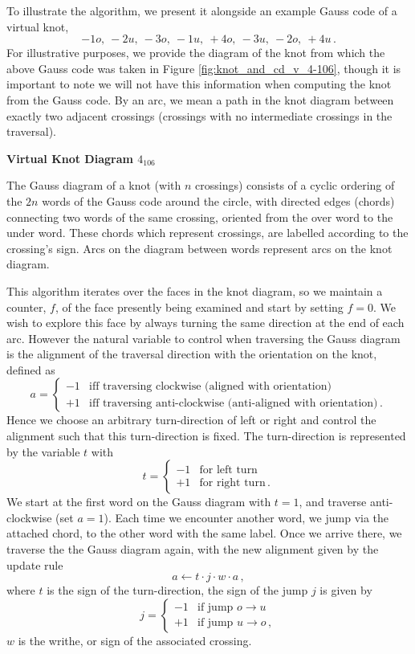\documentclass[12pt]{report}
\newcommand{\notered}[1]{{\color{Red} \textbf{#1}}}
\begin{document}
	To illustrate the algorithm, we present it alongside an example Gauss code of a virtual knot,
	\[-1o,\ -2u,\ -3o,\ -1u,\ +4o,\ -3u,\ -2o,\ +4u\,.\]
	For illustrative purposes, we provide the diagram of the knot from which the above Gauss code was taken in Figure \ref{fig:knot_and_cd_v_4-106}, though it is important to note we will not have this information when computing the knot from the Gauss code. By an arc, we mean a path in the knot diagram between exactly two adjacent crossings (crossings with no intermediate crossings in the traversal).
	
	\notered{Virtual Knot Diagram $4_{106}$}
		
	The Gauss diagram of a knot (with $n$ crossings) consists of a cyclic ordering of the $2n$ words of the Gauss code around the circle, with directed edges (chords) connecting two words of the same crossing, oriented from the over word to the under word. These chords which represent crossings, are labelled according to the crossing's sign. Arcs on the diagram between words represent arcs on the knot diagram.
	
	This algorithm iterates over the faces in the knot diagram, so we maintain a counter, $f$, of the face presently being examined and start by setting $f = 0$. We wish to explore this face by always turning the same direction at the end of each arc. However the natural variable to control when traversing the Gauss diagram is the alignment of the traversal direction with the orientation on the knot, defined as
	\[a = \begin{cases}
		-1 & \text{iff traversing clockwise (aligned with orientation)} \\
		+1 & \text{iff traversing anti-clockwise (anti-aligned with orientation)}\,.
	\end{cases}\] Hence we choose an arbitrary  turn-direction of left or right and control the alignment such that this turn-direction is fixed. The turn-direction is represented by the variable $t$ with
	\[t = \begin{cases}
		-1	& \text{for left turn}\\
		+1	& \text{for right turn} \,.
	\end{cases}\]
	We start at the first word on the Gauss diagram with $t = 1$, and traverse anti-clockwise (set $a = 1$). Each time we encounter another word, we jump via the attached chord, to the other word with the same label. Once we arrive there, we traverse the the Gauss diagram again, with the new alignment given by the update rule
	\[a \leftarrow t \cdot j \cdot w \cdot a\,,\]
	where $t$ is the sign of the turn-direction, the sign of the jump $j$ is given by
	\[j = \begin{cases}
		-1	& \text{if jump $o \to u$}\\
		+1	& \text{if jump $u \to o$}\,,
	\end{cases}\]
	$w$ is the writhe, or sign of the associated crossing.
	
\end{document}
